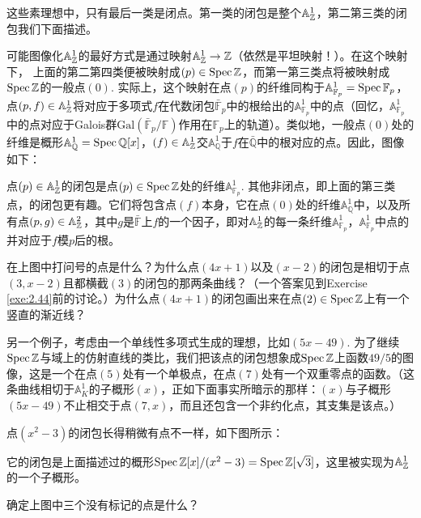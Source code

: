 这些素理想中，只有最后一类是闭点。第一类的闭包是整个$\mathbb{A}_{\mathbb{Z}}^1$，第二第三类的闭包我们下面描述。

可能图像化$\mathbb{A}_{\mathbb{Z}}^1$的最好方式是通过映射$\mathbb{A}_{\mathbb{Z}}^1\to\mathbb{Z}$（依然是平坦映射！）。在这个映射下， 上面的第二第四类便被映射成$(p)\in\operatorname{Spec} \mathbb{Z}$，而第一第三类点将被映射成$\operatorname{Spec} \mathbb{Z}$的一般点$(0)$. 实际上，这个映射在点$(p)$的纤维同构于$\mathbb{A}_{\mathbb{F}_p}^1=\operatorname{Spec} \mathbb{F}_p$，点$(p,f)\in\mathbb{A}_{\mathbb{Z}}^1$将对应于多项式$f$在代数闭包$\bar{\mathbb{F}}_p$中的根给出的$\mathbb{A}_{\mathbb{F}_p}^1$中的点（回忆，$\mathbb{A}_{\mathbb{F}_p}^1$中的点对应于Galois群$\mathrm{Gal}\left(\bar{\mathbb{F}}_p/\mathbb{F}\right)$作用在$\mathbb{F}_p$上的轨道）。类似地，一般点$(0)$处的纤维是概形$\mathbb{A}_\mathbb{Q}^1=\operatorname{Spec} \mathbb{Q}[x]$，$(f)\in\mathbb{A}_{\mathbb{Z}}^1$交$\mathbb{A}_\mathbb{Q}^1$于$f$在$\bar{\mathbb{Q}}$中的根对应的点。因此，图像如下：

\label{p:2.18}

点$(p)\in\mathbb{A}_{\mathbb{Z}}^1$的闭包是点$(p)\in \operatorname{Spec} \mathbb{Z}$处的纤维$\mathbb{A}_{\mathbb{F}_p}^1$. 其他非闭点，即上面的第三类点，的闭包更有趣。它们将包含点$(f)$本身，它在点$(0)$处的纤维$\mathbb{A}_\mathbb{Q}^1$中，以及所有点$(p,g)\in\mathbb{A}_{\mathbb{Z}}^2$，其中$g$是$\bar{\mathbb{F}}$上$f$的一个因子，即对$\mathbb{A}_{\mathbb{Z}}^1$的每一条纤维$\mathbb{A}_{\mathbb{F}_p}^1$，$\mathbb{A}_{\mathbb{F}_p}^1$中点的并对应于$f$模$p$后的根。

\begin{exe}\label{exe:2.38}
	在上图中打问号的点是什么？为什么点$(4x+1)$以及$(x-2)$的闭包是相切于点$(3,x-2)$且都横截$(3)$的闭包的那两条曲线？（一个答案见到Exercise \ref{exe:2.44}前的讨论。）为什么点$(4x+1)$的闭包画出来在点$(2)\in\operatorname{Spec} \mathbb{Z}$上有一个竖直的渐近线？
\end{exe}

另一个例子，考虑由一个单线性多项式生成的理想，比如$(5x-49)$. 为了继续$\operatorname{Spec} \mathbb{Z}$与域上的仿射直线的类比，我们把该点的闭包想象成$\operatorname{Spec}\mathbb{Z}$上函数$49/5$的图像，这是一个在点$(5)$处有一个单极点，在点$(7)$处有一个双重零点的函数。（这条曲线相切于$\mathbb{A}_K^1$的子概形$(x)$，正如下面事实所暗示的那样：$(x)$与子概形$(5x-49)$不止相交于点$(7,x)$，而且还包含一个非约化点，其支集是该点。）

点$(x^2-3)$的闭包长得稍微有点不一样，如下图所示：


\noindent 它的闭包是上面描述过的概形$\operatorname{Spec} \mathbb{Z}[x]/(x^2-3)=\operatorname{Spec} \mathbb{Z}[\sqrt 3]$，这里被实现为$\mathbb{A}_{\mathbb{Z}}^1$的一个子概形。

\begin{exe}\label{exe:2.39}
	确定上图中三个没有标记的点是什么？
\end{exe}

